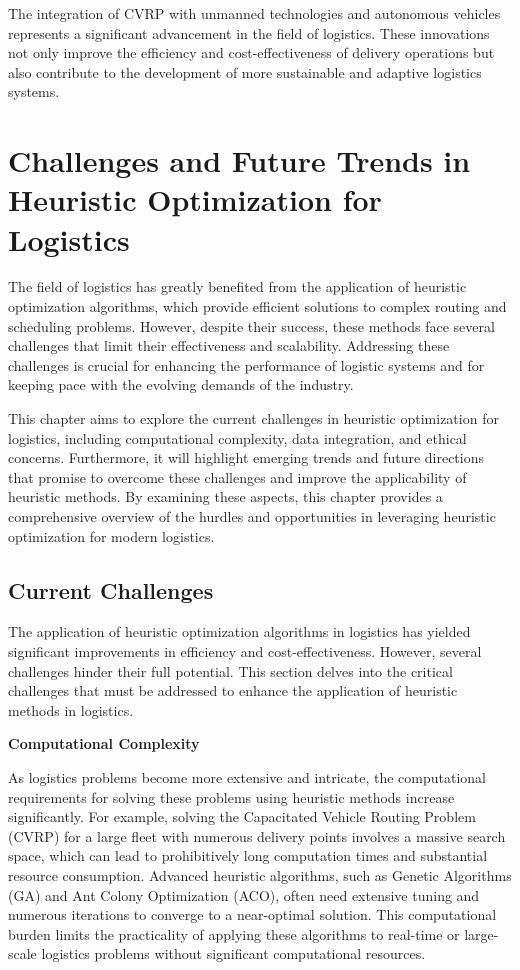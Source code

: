 \documentclass[
]{article}
\begin{document}
The integration of CVRP with unmanned technologies and autonomous vehicles represents a significant advancement in the field of logistics. These innovations not only improve the efficiency and cost-effectiveness of delivery operations but also contribute to the development of more sustainable and adaptive logistics systems.

\newpage
\section{Challenges and Future Trends in Heuristic Optimization for Logistics}

The field of logistics has greatly benefited from the application of heuristic optimization algorithms, which provide efficient solutions to complex routing and scheduling problems. However, despite their success, these methods face several challenges that limit their effectiveness and scalability. Addressing these challenges is crucial for enhancing the performance of logistic systems and for keeping pace with the evolving demands of the industry.

This chapter aims to explore the current challenges in heuristic optimization for logistics, including computational complexity, data integration, and ethical concerns. Furthermore, it will highlight emerging trends and future directions that promise to overcome these challenges and improve the applicability of heuristic methods. By examining these aspects, this chapter provides a comprehensive overview of the hurdles and opportunities in leveraging heuristic optimization for modern logistics.

\subsection{Current Challenges}

The application of heuristic optimization algorithms in logistics has yielded significant improvements in efficiency and cost-effectiveness. However, several challenges hinder their full potential. This section delves into the critical challenges that must be addressed to enhance the application of heuristic methods in logistics.

\textbf{Computational Complexity}

As logistics problems become more extensive and intricate, the computational requirements for solving these problems using heuristic methods increase significantly. For example, solving the Capacitated Vehicle Routing Problem (CVRP) for a large fleet with numerous delivery points involves a massive search space, which can lead to prohibitively long computation times and substantial resource consumption. Advanced heuristic algorithms, such as Genetic Algorithms (GA) and Ant Colony Optimization (ACO), often need extensive tuning and numerous iterations to converge to a near-optimal solution. This computational burden limits the practicality of applying these algorithms to real-time or large-scale logistics problems without significant computational resources.
\end{document}
